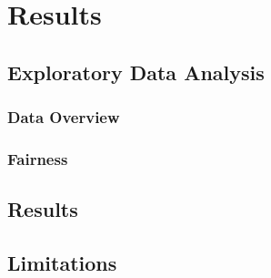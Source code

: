 \chapter{Results}\label{chap:Results}



\section{Exploratory Data Analysis}\label{sec:Exploratory_Data_Analysis}



\subsection{Data Overview}\label{subsec:Data_Overview}



\subsection{Fairness}\label{subsec:Fairness}



\section{Results}\label{sec:Results}        



\section{Limitations}\label{sec:Limitations}